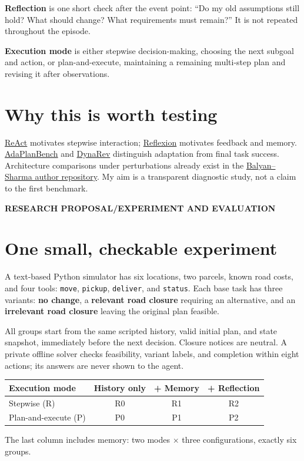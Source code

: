 \documentclass[11pt,a4paper]{article}
\newcommand{\kicker}[1]{{\sffamily\small\bfseries\color{teal}#1}\par}
\begin{document}
\textbf{Reflection} is one short check after the event point: ``Do my old assumptions still hold? What should change? What requirements must remain?'' It is not repeated throughout the episode.

\textbf{Execution mode} is either stepwise decision-making, choosing the next subgoal and action, or plan-and-execute, maintaining a remaining multi-step plan and revising it after observations.

\section{Why this is worth testing}
\href{https://arxiv.org/abs/2210.03629v3}{ReAct} motivates stepwise interaction; \href{https://arxiv.org/abs/2303.11366v4}{Reflexion} motivates feedback and memory. \href{https://arxiv.org/html/2606.05622v2}{AdaPlanBench} and \href{https://arxiv.org/html/2610.40133v1}{DynaRev} distinguish adaptation from final task success. Architecture comparisons under perturbations already exist in the \href{https://github.com/AyushBalyan/Benchmark}{Balyan--Sharma author repository}. My aim is a transparent diagnostic study, not a claim to the first benchmark.

\newpage
\kicker{RESEARCH PROPOSAL\quad /\quad EXPERIMENT AND EVALUATION}
\section{One small, checkable experiment}
A text-based Python simulator has six locations, two parcels, known road costs, and four tools: \texttt{move}, \texttt{pickup}, \texttt{deliver}, and \texttt{status}. Each base task has three variants: \textbf{no change}, a \textbf{relevant road closure} requiring an alternative, and an \textbf{irrelevant road closure} leaving the original plan feasible.

All groups start from the same scripted history, valid initial plan, and state snapshot, immediately before the next decision. Closure notices are neutral. A private offline solver checks feasibility, variant labels, and completion within eight actions; its answers are never shown to the agent.

\begingroup
\renewcommand{\arraystretch}{1.35}
\begin{tabularx}{\linewidth}{@{}Xccc@{}}
\toprule
\textbf{Execution mode} & \textbf{History only} & \textbf{+ Memory} & \textbf{+ Reflection}\tabularnewline
\midrule
Stepwise (R) & R0 & R1 & R2\tabularnewline
Plan-and-execute (P) & P0 & P1 & P2\tabularnewline
\bottomrule
\end{tabularx}
\endgroup
\par\vspace{3pt}
The last column includes memory: two modes $\times$ three configurations, exactly six groups.
\end{document}
